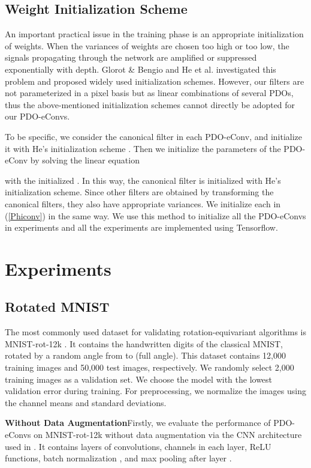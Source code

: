 \documentclass{article}
\begin{document}
\subsection{Weight Initialization Scheme \label{initialize}}
An important practical issue in the training phase is an appropriate initialization of weights.
When the variances of weights are chosen too high or too low, 
the signals propagating through the network are amplified or suppressed exponentially with depth. 
Glorot \& Bengio  and He et al.  investigated this problem and proposed widely used initialization schemes. However, our filters are not parameterized in a pixel basis but as linear combinations of several PDOs,
thus the above-mentioned initialization schemes cannot directly be adopted for our PDO-eConvs.

To be specific, we consider the canonical filter  in each PDO-eConv, and initialize it with He's initialization scheme \cite{he2015delving}. Then we initialize the parameters  of the PDO-eConv by solving the linear equation

with the initialized . In this way, the canonical filter is initialized with He's initialization scheme. Since other filters are obtained by transforming the canonical filters, they also have appropriate variances. We initialize each  in (\ref{Phiconv}) in the same way. We use this method to initialize all the PDO-eConvs in experiments and all the experiments are implemented using Tensorflow.

\section{Experiments}
\subsection{Rotated MNIST}

The most commonly used dataset for validating rotation-equivariant algorithms is MNIST-rot-12k \cite{larochelle2007empirical}. It contains the handwritten digits of the classical MNIST, rotated by a random angle from  to  (full angle). This dataset contains 12,000 training images and 50,000 test images, respectively. We randomly select 2,000 training images as a validation set. We choose the model with the lowest validation error during training. For preprocessing, we normalize the images using the channel means and standard deviations.

\textbf{Without Data Augmentation}\quad Firstly, we evaluate the performance of PDO-eConvs on MNIST-rot-12k without data augmentation via the CNN architecture used in \cite{cohen2016group}. It contains  layers of  convolutions,  channels in each layer, ReLU functions, batch normalization \cite{ioffe2015batch}, and max pooling after layer . 
\end{document}
